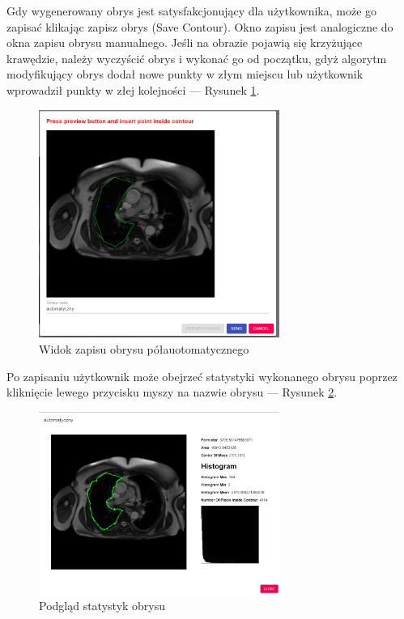 \documentclass[a4paper,11pt,twoside,openright]{report}
\theoremstyle{definition}
\begin{document}
\begin{enumerate}
Gdy wygenerowany obrys jest satysfakcjonujący dla użytkownika, może go zapisać
klikając zapisz obrys (Save Contour). Okno zapisu jest analogiczne do okna zapisu
obrysu manualnego. Jeśli na obrazie pojawią się krzyżujące krawędzie, należy
wyczyścić obrys i wykonać go od początku, gdyż algorytm modyfikujący obrys dodał
nowe punkty w złym miejscu lub użytkownik wprowadził punkty w złej kolejności
--- Rysunek \ref{fig:14}.

\pagebreak

\begin{figure}[h!]
	\center
	\includegraphics[width=0.7\textwidth]{14}
	\caption{Widok zapisu obrysu półauotomatycznego}
    	\label{fig:14}
\end{figure}

Po zapisaniu użytkownik może obejrzeć statystyki wykonanego obrysu poprzez
kliknięcie lewego przycisku myszy na nazwie obrysu --- Rysunek \ref{fig:15}.

\begin{figure}[h!]
	\center
	\includegraphics[width=0.7\textwidth]{15}
	\caption{Podgląd statystyk obrysu}
    	\label{fig:15}
\end{figure}


\end{enumerate}
\end{document}
